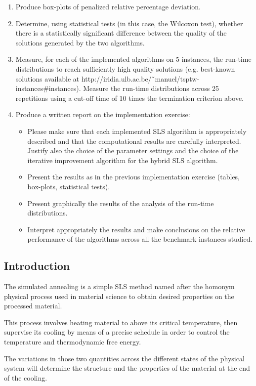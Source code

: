 \begin{homeworkProblem}
\begin{enumerate}
\item Produce box-plots of penalized relative percentage deviation.
\item Determine, using statistical tests (in this case, the Wilcoxon test), whether there is a statistically significant difference between the quality of the solutions generated by the two algorithms.
\item Measure, for each of the implemented algorithms on 5 instances, the run-time distributions to reach sufficiently high quality solutions (e.g. best-known solutions available at http://iridia.ulb.ac.be/˜manuel/tsptw-instances\#instances).
Measure the run-time distributions across 25 repetitions using a cut-off time of 10 times the termination criterion above.
\item Produce a written report on the implementation exercise:
\begin{itemize}
  \item Please make sure that each implemented SLS algorithm is appropriately described and that the computational results are carefully interpreted. Justify also the choice of the parameter settings and the choice
of the iterative improvement algorithm for the hybrid SLS algorithm.
  \item Present the results as in the previous implementation exercise (tables, box-plots, statistical tests).
  \item Present graphically the results of the analysis of the run-time distributions.
  \item Interpret appropriately the results and make conclusions on the relative performance of the algorithms across all the benchmark instances studied.
\end{itemize}
\end{enumerate}


\subsection{Introduction} \label{sec:introSA}
The simulated annealing is a simple SLS method named after the homonym physical process used in material science to obtain desired properties on the processed material.

This process involves heating material to above its critical temperature, then supervise its cooling by means of a precise schedule in order to control the temperature and thermodynamic free energy.

The variations in those two quantities across the different states of the physical system will determine the structure and the properties of the material at the end of the cooling.


\end{homeworkProblem}
